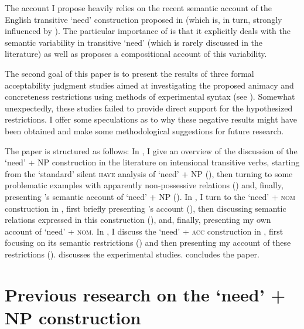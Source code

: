 \documentclass[output=paper,colorlinks,citecolor=brown]{langscibook}
\begin{document}
The account I propose heavily relies on the recent semantic account of the English transitive `need' construction proposed in \citet{Zaroukian.Beller2013} (which is, in turn, strongly influenced by \citealt{Vikner.Jensen2002}). The particular importance of \citet{Zaroukian.Beller2013} is that it explicitly deals with the semantic variability in transitive `need' (which is rarely discussed in the literature) as well as proposes a compositional account of this variability.

The second goal of this paper is to present the results of three formal acceptability judgment studies aimed at investigating the proposed animacy and concreteness restrictions using methods of experimental syntax (see \citealt{Sprouse.Hornstein2013}). Somewhat unexpectedly, these studies failed to provide direct support for the hypothesized restrictions. I offer some speculations as to why these negative results might have been obtained and make some methodological suggestions for future research.

The paper is structured as follows: In , I give an overview of the discussion of the `need' + NP construction in the literature on intensional transitive verbs, starting from the `standard' silent \textsc{have} analysis of `need' + NP (), then turning to some problematic examples with apparently non-possessive relations () and, finally, presenting \citeauthor{Zaroukian.Beller2013}'s \citeyearpar{Zaroukian.Beller2013} semantic account of `need' + NP (). In , I turn to the `need' + \textsc{nom} construction in , first briefly presenting \citeauthor{Harves2008}'s \citeyearpar{Harves2008} account (), then discussing semantic relations expressed in this construction (), and, finally, presenting my own account of `need' + \textsc{nom}. In , I discuss the `need' + \textsc{acc} construction in , first focusing on its semantic restrictions () and then presenting my account of these restrictions ().  discusses the experimental studies.  concludes the paper.

\section{Previous research on the `need' + NP construction\label{section-background}}
\end{document}
